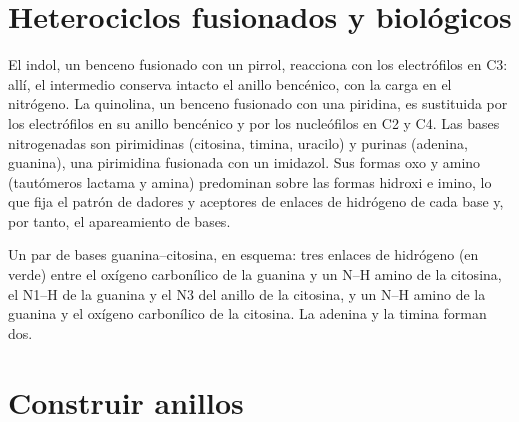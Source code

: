 \section{Heterociclos fusionados y biológicos}

El indol, un benceno fusionado con un pirrol, reacciona con los electrófilos en C3: allí, el
intermedio conserva intacto el anillo bencénico, con la carga en el nitrógeno.
La quinolina, un benceno fusionado con una piridina, es sustituida por los electrófilos en
su anillo bencénico y por los nucleófilos en C2 y C4. Las bases nitrogenadas son
pirimidinas (citosina, timina, uracilo) y purinas (adenina, guanina), una
pirimidina fusionada con un imidazol. Sus formas oxo y amino (tautómeros lactama y
amina) predominan sobre las formas hidroxi e imino, lo que fija el patrón de
dadores y aceptores de enlaces de hidrógeno de cada base y, por tanto, el apareamiento de bases.

\begin{omfigure}

{\small Un par de bases guanina--citosina, en esquema: tres enlaces de hidrógeno (en verde)
entre el oxígeno carbonílico de la guanina y un N--H amino de la citosina, el N1--H de
la guanina y el N3 del anillo de la citosina, y un N--H amino de la guanina y el
oxígeno carbonílico de la citosina. La adenina y la timina forman dos.}
\end{omfigure}

\section{Construir anillos}

